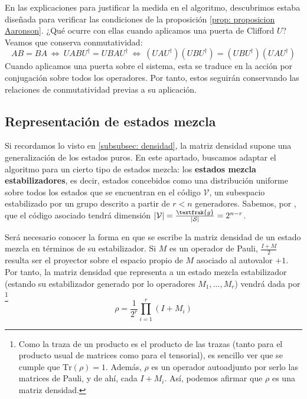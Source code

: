 \documentclass[11pt,a4paper,twoside,pdf]{article}
\numberwithin{equation}{section}
\begin{document}
 	\vspace{.3cm}
	
	En las explicaciones para justificar la medida en el algoritmo, descubrimos estaba diseñada para verificar las condiciones de la proposición \ref{prop: proposicion Aaronson}. ¿Qué ocurre con ellas cuando aplicamos una puerta de Clifford $U$? Veamos que conserva conmutatividad:
		\begin{equation*}
			AB=BA \: \Leftrightarrow \: UABU^\dagger = U BA U^\dagger  \: \Leftrightarrow \: (UAU^\dagger)( UBU^\dagger) = (UBU^\dagger)( UAU^\dagger)
		\end{equation*}	
	Cuando aplicamos una puerta sobre el sistema, esta se traduce en la acción por conjugación sobre todos los operadores. Por tanto, estos seguirán conservando las relaciones de conmutatividad previas a su aplicación.	
	
	
		
	\subsection{Representación de estados mezcla}
		
	Si recordamos lo visto en \ref{subsubsec: densidad}, la matriz densidad supone una generalización de los estados puros. En este apartado, buscamos adaptar el algoritmo para un cierto tipo de estados mezcla: los \textbf{estados mezcla estabilizadores}, es decir, estados concebidos como una distribución uniforme sobre todos los estados que se encuentran en el código $\mathcal{V}$, un subespacio estabilizado por un grupo descrito a partir de $r<n$ generadores. Sabemos, por \cite{Bermejo VandenNest}, que el código asociado tendrá dimensión $|\mathcal{V}|=\frac{\textfrak{g}}{|\mathcal{S}|}=2^{n-r}$.
		
	Será necesario conocer la forma en que se escribe la matriz densidad de un estado mezcla en términos de su estabilizador. Si $M$ es un operador de Pauli, $\frac{I+M}{2}$ resulta ser el proyector sobre el espacio propio de $M$ asociado al autovalor $+1$. Por tanto, la matriz densidad que representa a un estado mezcla estabilizador (estando su estabilizador generado por lo operadores $M_1,...,M_r$) vendrá dada por \footnote{Como la traza de un producto es el producto de las trazas (tanto para el producto usual de matrices como para el tensorial), es sencillo ver que se cumple que $\text{Tr}(\rho)=1$. Además, $\rho$ es un operador autoadjunto por serlo las matrices de Pauli, y de ahí, cada $I+M_i$. Así, podemos afirmar que $\rho$ es una matriz densidad.}
			\begin{equation} \label{ec: matriz densidad}
				\rho = \frac{1}{2^r} \displaystyle\prod_{i=1}^r \left( I+M_i \right) 
			\end{equation}
	
\end{document}
